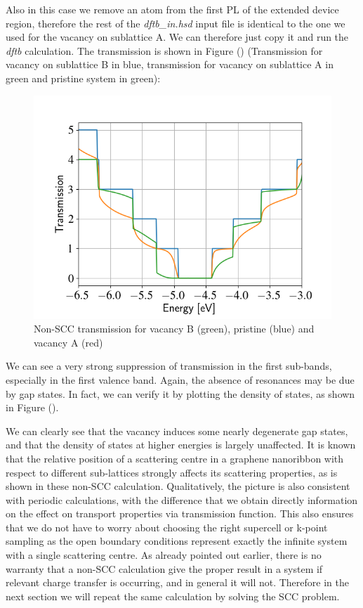 \documentclass[a4paper,11pt,english]{sphinxmanual}
\begin{document}
{{Also in this case we remove an atom from the first PL of the extended
device region, therefore the rest of the \emph{dftb\_in.hsd} input file is
identical to the one we used for the vacancy on sublattice A. We can
therefore just copy it and run the \emph{dftb} calculation. The
transmission is shown in Figure {\hyperref[transport:fig-nonscc-vac2-tunn]{\emph{}}} ()
(Transmission for vacancy on sublattice B in blue, transmission for
vacancy on sublattice A in green and pristine system in green):
\begin{figure}[t]
\centering
\capstart
\includegraphics[width=0.700\linewidth]{nonscc-vac2-tunn.png}
\caption{Non-SCC transmission for vacancy B (green), pristine (blue) and
vacancy A (red)}\label{transport:fig-nonscc-vac2-tunn}\end{figure}

We can see a very strong suppression of transmission in the first
sub-bands, especially in the first valence band. Again, the absence of
resonances may be due by gap states. In fact, we can verify it by
plotting the density of states, as shown in Figure
{\hyperref[transport:fig-nonscc-vac2-dos]{\emph{}}} ().

We can clearly see that the vacancy induces some nearly degenerate gap
states, and that the density of states at higher energies is largely
unaffected. It is known that the relative position of a scattering
centre in a graphene nanoribbon with respect to different sub-lattices
strongly affects its scattering properties, as is shown in these
non-SCC calculation. Qualitatively, the picture is also consistent
with periodic calculations, with the difference that we obtain
directly information on the effect on transport properties via
transmission function. This also ensures that we do not have to worry
about choosing the right supercell or k-point sampling as the open
boundary conditions represent exactly the infinite system with a
single scattering centre. As already pointed out earlier, there is no
warranty that a non-SCC calculation give the proper result in a system
if relevant charge transfer is occurring, and in general it will
not. Therefore in the next section we will repeat the same calculation
by solving the SCC problem.

}}
\end{document}

